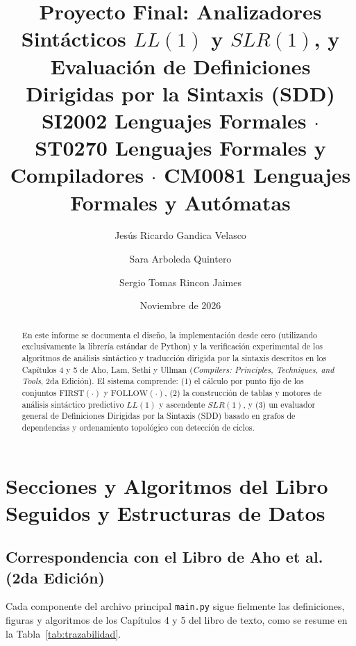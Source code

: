 \documentclass[11pt,a4paper]{article}
\title{\textbf{Proyecto Final: Analizadores Sint\'acticos $LL(1)$ y $SLR(1)$, y Evaluaci\'on de Definiciones Dirigidas por la Sintaxis (SDD)}\\[0.4em]
\large SI2002 Lenguajes Formales $\cdot$ ST0270 Lenguajes Formales y Compiladores $\cdot$ CM0081 Lenguajes Formales y Aut\'omatas}
\author{Jes\'us Ricardo Gandica Velasco \and Sara Arboleda Quintero \and Sergio Tomas Rincon Jaimes}
\date{Noviembre de 2026}
\begin{document}
\maketitle

\begin{abstract}
En este informe se documenta el dise\~no, la implementaci\'on desde cero (utilizando exclusivamente la librer\'ia est\'andar de Python) y la verificaci\'on experimental de los algoritmos de an\'alisis sint\'actico y traducci\'on dirigida por la sintaxis descritos en los Cap\'itulos 4 y 5 de Aho, Lam, Sethi y Ullman (\textit{Compilers: Principles, Techniques, and Tools}, 2da Edici\'on). El sistema comprende: (1) el c\'alculo por punto fijo de los conjuntos $\text{FIRST}(\cdot)$ y $\text{FOLLOW}(\cdot)$, (2) la construcci\'on de tablas y motores de an\'alisis sint\'actico predictivo $LL(1)$ y ascendente $SLR(1)$, y (3) un evaluador general de Definiciones Dirigidas por la Sintaxis (SDD) basado en grafos de dependencias y ordenamiento topol\'ogico con detecci\'on de ciclos.
\end{abstract}

\tableofcontents
\newpage

\section{Secciones y Algoritmos del Libro Seguidos y Estructuras de Datos}

\subsection{Correspondencia con el Libro de Aho et al. (2da Edici\'on)}
Cada componente del archivo principal \texttt{main.py} sigue fielmente las definiciones, figuras y algoritmos de los Cap\'itulos 4 y 5 del libro de texto, como se resume en la Tabla~\ref{tab:trazabilidad}.
\end{document}
